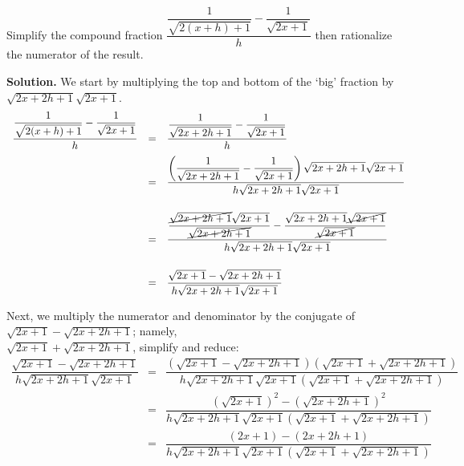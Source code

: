 \documentclass[10pt]{article}
\begin{document}
\begin{ex} \label{rationalizenumdenombosslevel}

Simplify the compound fraction $\dfrac{\dfrac{1}{\sqrt{2(x+h)+1}} - \dfrac{1}{\sqrt{2x+1}}}{h}$ then rationalize the numerator of the result.

\medskip

{\bf Solution.} We start by multiplying the top and bottom of the `big' fraction by $\sqrt{2x+2h+1} \sqrt{2x+1}$.  \[ \begin{array}{rcl}

\dfrac{\dfrac{1}{\sqrt{2(x+h)+1}} - \dfrac{1}{\sqrt{2x+1}}}{h} & = & \dfrac{\dfrac{1}{\sqrt{2x+2h+1}} - \dfrac{1}{\sqrt{2x+1}}}{h}\\[10pt]

                                                               & = & \dfrac{\left(\dfrac{1}{\sqrt{2x+2h+1}} - \dfrac{1}{\sqrt{2x+1}}\right) \sqrt{2x+2h+1} \sqrt{2x+1}}{h\sqrt{2x+2h+1} \sqrt{2x+1}}\\[22pt]
																															
																															& = & \dfrac{\dfrac{\cancel{\sqrt{2x+2h+1}}\sqrt{2x+1}}{\cancel{\sqrt{2x+2h+1}}} - \dfrac{\sqrt{2x+2h+1} \cancel{\sqrt{2x+1}}}{\cancel{\sqrt{2x+1}}}}{h\sqrt{2x+2h+1} \sqrt{2x+1}}\\[22pt]
																																			
																															& = & \dfrac{\sqrt{2x + 1}- \sqrt{2x+2h+1}}{h\sqrt{2x+2h+1} \sqrt{2x+1}}\\	
																															\end{array}\]
																															
Next, we multiply the numerator and denominator by the conjugate of $\sqrt{2x+1} - \sqrt{2x+2h+1}$; namely,\\
 $\sqrt{2x+1} + \sqrt{2x+2h+1}$, simplify and reduce:\[\begin{array}{rcl}

 \dfrac{\sqrt{2x + 1}- \sqrt{2x+2h+1}}{h\sqrt{2x+2h+1} \sqrt{2x+1}} & = & \dfrac{(\sqrt{2x+1} - \sqrt{2x+2h+1})(\sqrt{2x+1} + \sqrt{2x+2h+1})}{h\sqrt{2x+2h+1} \sqrt{2x+1}(\sqrt{2x+1} + \sqrt{2x+2h+1})} \\ [20pt]

 & = & \dfrac{(\sqrt{2x+1})^2 - (\sqrt{2x+2h+1})^2}{h\sqrt{2x+2h+1} \sqrt{2x+1}(\sqrt{2x+1} + \sqrt{2x+2h+1})} \\[20pt]

 & = & \dfrac{(2x+1) - (2x+2h+1)}{h\sqrt{2x+2h+1} \sqrt{2x+1}(\sqrt{2x+1} + \sqrt{2x+2h+1})} \\[20pt]


\end{array}\]
\end{ex}
\end{document}
